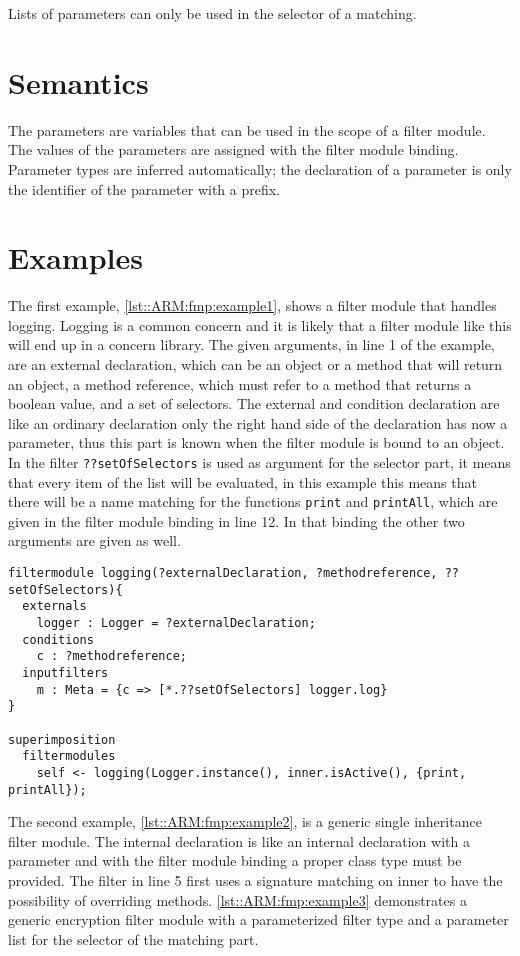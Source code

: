 Lists of parameters can only be used in the selector of a matching.

\section*{Semantics}
The parameters are variables that can be used in the scope of a filter module. The values of the parameters are assigned with the filter module binding.
Parameter types are inferred automatically; the declaration of a parameter is 
only the identifier of the parameter with a prefix.

\section*{Examples}
The first example, \autoref{lst::ARM:fmp:example1}, shows a filter module that
handles logging. Logging is a common concern and it is likely that a filter module like
this will end up in a concern library. The given arguments, in line 1 of the example, are an external declaration,
which can be an object or a method that will return an object, a method reference, 
which must refer to a method that returns a boolean value, and a set of selectors.
The external and condition declaration are like an ordinary declaration only the right hand side of the declaration has now a parameter, thus this part is known when the filter module is bound to an object.
In the filter \lstinline!??setOfSelectors! is used as argument for the selector part, it means that
every item of the list will be evaluated, in this example this means that there will be a name matching for the functions \lstinline!print! and \lstinline!printAll!, which are given in the filter module binding in line 12.
In that binding the other two arguments are given as well.

\begin{lstlisting}[caption={Example of a filter module for logging},label=lst::ARM:fmp:example1,
style=listing,language=ComposeStar,float=tpb]
filtermodule logging(?externalDeclaration, ?methodreference, ??setOfSelectors){
  externals
    logger : Logger = ?externalDeclaration;
  conditions
    c : ?methodreference;
  inputfilters
    m : Meta = {c => [*.??setOfSelectors] logger.log}
} 

superimposition
  filtermodules
    self <- logging(Logger.instance(), inner.isActive(), {print, printAll});
\end{lstlisting}

The second example, \autoref{lst::ARM:fmp:example2}, is a generic single inheritance filter module.
The internal declaration is like an internal declaration with a parameter and with the filter module binding
a proper class type must be provided. The filter in line 5 first uses a signature matching on inner to have the possibility of overriding methods. \autoref{lst::ARM:fmp:example3} demonstrates a generic encryption filter module with a parameterized filter type and a parameter list for the selector of the matching part.

